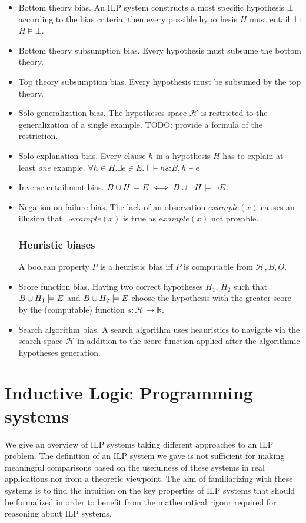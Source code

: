 \begin{itemize}
\item Bottom theory bias. An ILP system constructs a most specific hypothesis $\bot$ according to the bias criteria, then every possible hypothesis $H$ must entail $\bot$: $H \models \bot$.
\item Bottom theory subsumption bias. Every hypothesis must subsume the bottom theory.
\item Top theory subsumption bias. Every hypothesis must be subsumed by the top theory.
\item Solo-generalization bias. The hypotheses space $\mathcal{H}$ is restricted to the generalization of a single example. \cite{muggleton2012}
TODO: provide a formula of the restriction.
\item Solo-explanation bias. Every clause $h$ in a hypothesis $H$ has to explain at least \emph{one} example.
$\forall h \in H. \exists e \in E. \top \models h \& B, h \models e$
\item Inverse entailment bias.
$B \cup H \models E \iff B \cup \neg H \models \neg E$.
\item Negation on failure bias. The lack of an observation $example(x)$
causes an illusion that $\neg example(x)$ is true as $example(x)$ not provable.

\subsubsection{Heuristic biases}
\begin{defn}
A boolean property $P$ is a heuristic bias iff $P$ is computable from $\mathcal{H}, B, O$.
\end{defn}
\item Score function bias. Having two correct hypotheses $H_1$, $H_2$ such that $B \cup H_1 \models E$ and $B \cup H_2 \models E$ choose the hypothesis with the greater score by the (computable) function $s:\mathcal{H} \to \mathbb{R}$.
\item Search algorithm bias. A search algorithm uses heauristics to navigate via the search space $\mathcal{H}$ in addition to the score function applied after the algorithmic hypotheses generation.
\end{itemize}

\section{Inductive Logic Programming systems}
We give an overview of ILP systems taking different approaches to an ILP problem. The definition of an ILP system we gave is not sufficient for making meaningful comparisons based on the usefulness of these systems in real applications nor from a theoretic viewpoint. The aim of familiarizing with these systems is to find the intuition on the key properties of ILP systems that should be formalized in order to benefit from the mathematical rigour required for reasoning about ILP systems.

